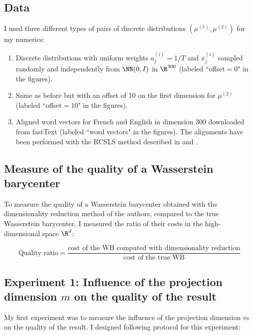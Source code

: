 \documentclass[11pt,a4paper]{article}
\begin{document}
\subsection{Data}
\label{subscn:data}

I used three different types of pairs of discrete distributions $(\mu^{(1)}, \mu^{(2)})$ for my numerics:
\begin{enumerate}
    \item Discrete distributions with uniform weights $a^{(i)}_j = 1 / T$ and $x^{(i)}_j$ sampled randomly and independently from $\NN(0, I)$ in $\R^{300}$ (labeled ``offset$=0$" in the figures).
    \item Same as before but with an offset of 10 on the first dimension for $\mu^{(2)}$ (labeled ``offset$=10$" in the figures).
    \item Aligned word vectors for French and English in dimension 300 downloaded from fastText \cite{noauthor_aligned_nodate} (labeled ``word vectors" in the figures). The alignments have been performed with the RCSLS method described in \cite{joulin_loss_2018} and \cite{bojanowski_enriching_2017}.
\end{enumerate}

\subsection{Measure of the quality of a Wasserstein barycenter}

To measure the quality of a Wasserstein barycenter obtained with the dimensionality reduction method of the authors, compared to the true Wasserstein barycenter, I measured the ratio of their costs in the high-dimensional space $\R^d$:

$$\text{Quality ratio} = \frac {\text{cost of the WB computed with dimensionality reduction}} {\text{cost of the true WB}}$$

\subsection{Experiment 1: Influence of the projection dimension $m$ on the quality of the result}

My first experiment was to measure the influence of the projection dimension $m$ on the quality of the result. I designed following protocol for this experiment:
\end{document}
